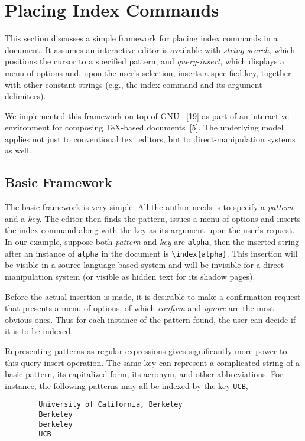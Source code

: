 \section{Placing Index Commands}
This section discusses a simple framework for placing index commands
in a document.  It assumes an interactive editor is available with
{\it string search\/}, which positions the cursor to a specified pattern, and
{\it query-insert\/}, which displays a menu of
options and, upon the user's selection, inserts
a specified key, together with other constant strings (e.g.,
the index command and its argument delimiters).

We implemented this framework on top of
GNU {\E}~[19] as part of an interactive environment for
composing {\TeX}-based documents~[5].
The underlying model applies not just to conventional text
editors, but to direct-manipulation systems as well.

\subsection{Basic Framework}
The basic framework is very simple.  All the author needs is
to specify a {\it pattern\/} and a {\it key\/}.
The editor then finds the pattern,
issues a menu of options and inserts the index command along with the key
as its argument upon the user's request.
In our example, suppose both {\it pattern\/} and {\it key\/} are
\verb|alpha|, then the inserted string after an instance
of \verb|alpha| in the document is \verb|\index{alpha}|.
This insertion will be visible in a source-language based system and will be
invisible for a direct-manipulation system (or visible as hidden text
for its shadow pages).

Before the actual insertion is made, it is desirable to make a confirmation
request that presents a menu of options, of which
{\it confirm\/} and {\it ignore\/} are the most obvious ones.
Thus for each instance of the pattern found, the user can decide if
it is to be indexed.

Representing patterns as regular expressions gives significantly more power
to this query-insert operation.  The same key can represent a complicated
string of a basic pattern, its capitalized form, its acronym, and other
abbreviations.  For instance, the following patterns may all be indexed
by the key \verb|UCB|,
\begin{verbatim}
        University of California, Berkeley
        Berkeley
        berkeley
        UCB
\end{verbatim}


